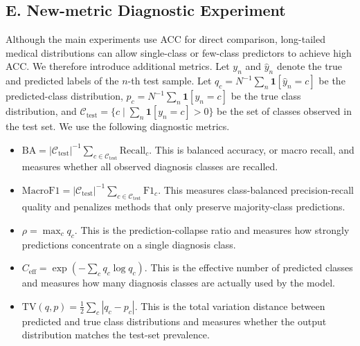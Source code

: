 \documentclass[letterpaper]{article} %
\begin{document}
\subsection{E. New-metric Diagnostic Experiment}
Although the main experiments use ACC for direct comparison, long-tailed medical distributions can allow single-class or few-class predictors to achieve high ACC. We therefore introduce additional metrics. Let \(y_n\) and \(\hat{y}_n\) denote the true and predicted labels of the \(n\)-th test sample. Let \(q_c=N^{-1}\sum_n\mathbf{1}[\hat{y}_n=c]\) be the predicted-class distribution, \(p_c=N^{-1}\sum_n\mathbf{1}[y_n=c]\) be the true class distribution, and \(\mathcal{C}_{\mathrm{test}}=\{c\mid \sum_n\mathbf{1}[y_n=c]>0\}\) be the set of classes observed in the test set. We use the following diagnostic metrics.

\begin{itemize}
\item \(\mathrm{BA}=|\mathcal{C}_{\mathrm{test}}|^{-1}\sum_{c\in\mathcal{C}_{\mathrm{test}}}\mathrm{Recall}_c\). This is balanced accuracy, or macro recall, and measures whether all observed diagnosis classes are recalled.
\item \(\mathrm{MacroF1}=|\mathcal{C}_{\mathrm{test}}|^{-1}\sum_{c\in\mathcal{C}_{\mathrm{test}}}\mathrm{F1}_c\). This measures class-balanced precision-recall quality and penalizes methods that only preserve majority-class predictions.
\item \(\rho=\max_c q_c\). This is the prediction-collapse ratio and measures how strongly predictions concentrate on a single diagnosis class.
\item \(C_{\mathrm{eff}}=\exp\left(-\sum_c q_c\log q_c\right)\). This is the effective number of predicted classes and measures how many diagnosis classes are actually used by the model.
\item \(\mathrm{TV}(q,p)=\frac{1}{2}\sum_c |q_c-p_c|\). This is the total variation distance between predicted and true class distributions and measures whether the output distribution matches the test-set prevalence.
\end{itemize}
\end{document}
